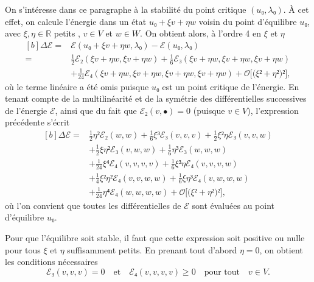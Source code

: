 \documentclass[12pt, final]{scrartcl}
\theoremstyle{definition}
\newcommand{\reals}{\mathbb{R}}
\begin{document}
On s'intéresse dans ce paragraphe à la stabilité du point critique \((u₀,
λ₀)\). À cet effet, on calcule l'énergie dans un état \(u₀ + ξ v + η w\) voisin
du point d'équilibre \(u₀\), avec \(ξ, η∈\reals\) {\guillemotleft} petits
{\guillemotright}, \(v \in V\) et \(w∈W\). On obtient alors, à l'ordre 4 en
\(ξ\) et \(η\)
\begin{equation}
  \begin{aligned}[b]
    Δℰ ={} &  ℰ(u₀ + ξv + ηw, λ₀) - ℰ(u₀, λ₀)\\
    ={} & \tfrac{1}{2} ℰ₂(ξv + ηw, ξv + ηw) + \tfrac{1}{6} ℰ₃(ξv + ηw, ξv + ηw, ξv + ηw)\\
    & + \tfrac{1}{24} ℰ₄(ξv + ηw, ξv + ηw, ξv + ηw, ξv + ηw) + \mathcal{O}\bigl[\bigl(ξ² + η²\bigr)²\bigr],
  \end{aligned}
\end{equation}
où le terme linéaire a été omis puisque \(u₀\) est un point critique de
l'énergie. En tenant compte de la multilinéarité et de la symétrie des
différentielles successives de l'énergie \(ℰ\), ainsi que du fait que
\(ℰ₂(v, •) = 0\) (puisque \(v∈V\)), l'expression précédente s'écrit
\begin{equation}
  \begin{aligned}[b]
    \Delta ℰ ={} & \tfrac{1}{2} η² ℰ₂(w, w) + \tfrac{1}{6} ξ³ ℰ₃(v, v, v) + \tfrac{1}{2} ξ² η ℰ₃(v, v, w)\\
    & + \tfrac{1}{2} ξ η² ℰ₃(v, w, w) + \tfrac{1}{6} η³ ℰ₃(w, w, w)\\
    & + \tfrac{1}{24} ξ⁴ ℰ₄(v, v, v, v) + \tfrac{1}{6} ξ³ η ℰ₄(v, v, v, w)\\
    & + \tfrac{1}{4} ξ² η² ℰ₄(v, v, w, w) + \tfrac{1}{6} ξ η³ ℰ₄(v, w, w, w)\\
    & + \tfrac{1}{24} η⁴ ℰ₄(w, w, w, w) +\mathcal{O}\bigl[\bigl(ξ² + η²\bigr)²\bigr],
  \end{aligned}
\end{equation}
où l'on convient que toutes les différentielles de \(ℰ\) sont évaluées au point
d'équilibre \(u₀\).

Pour que l'équilibre soit stable, il faut que cette expression soit positive ou
nulle pour tous \(ξ\) et \(η\) suffisamment petits. En prenant tout d'abord
\(η = 0\), on obtient les conditions nécessaires
\begin{equation}
  \label{eq:20211108164416}
  ℰ₃(v, v, v) = 0 \quad \text{et} \quad ℰ₄(v, v, v, v) \geq 0 \quad \text{pour tout} \quad v∈V.
\end{equation}
\end{document}
